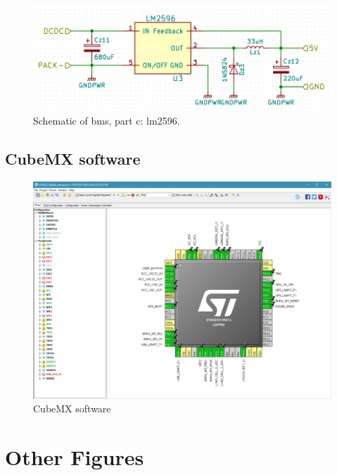 \begin{figure}[h]
	\centering
    \includegraphics[width=\linewidth]{Figures/gasgauge_sch_lm2529.png}
	\caption{Schematic of \gls{bms}, part c: lm2596.}
	\label{fig:schbmsr}
\end{figure}


\clearpage
\subsection{CubeMX software}\label{sec:app:mxc}
\begin{figure}[tbh]
	\centering
    \includegraphics[width=\linewidth]{Figures/MXCube.png}
	\caption{CubeMX software}
	\label{fig:mxc}
\end{figure}

\clearpage
\section{Other Figures}
